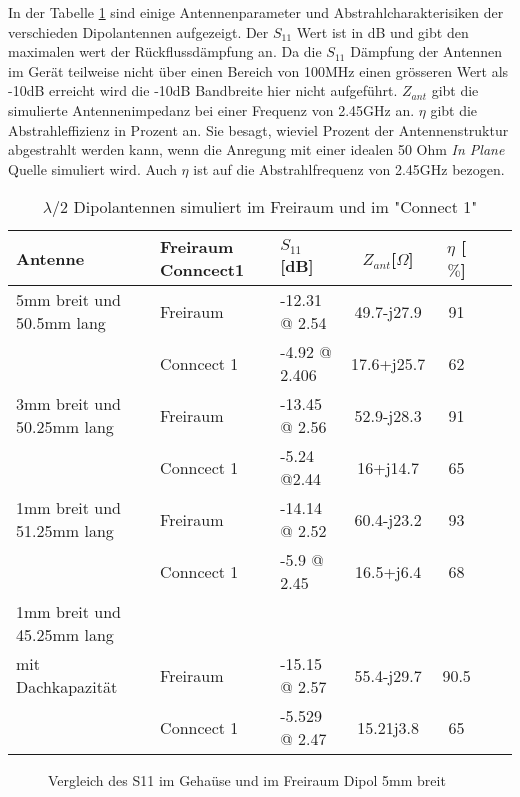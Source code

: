 In der Tabelle \ref{tab:Vergeich_Lambda/2_Freiraum_Geraet} sind einige Antennenparameter und Abstrahlcharakterisiken der verschieden Dipolantennen aufgezeigt. Der $S_{11}$ Wert ist in dB und gibt den maximalen wert der Rückflussdämpfung an. Da die $S_{11}$ Dämpfung der Antennen im Gerät teilweise nicht über einen Bereich von 100MHz einen grösseren Wert als -10dB erreicht wird die -10dB Bandbreite hier nicht aufgeführt.
$Z_{ant}$ gibt die simulierte Antennenimpedanz bei einer Frequenz von 2.45GHz an.
$\eta$ gibt die Abstrahleffizienz in Prozent an. Sie besagt, wieviel Prozent der Antennenstruktur abgestrahlt werden kann, wenn die Anregung mit einer idealen 50 Ohm \textit{In Plane} Quelle simuliert wird. Auch $\eta$ ist auf die Abstrahlfrequenz von 2.45GHz bezogen.

\begin{table}[!ht]
  \centering
  \begin{tabular}{p{4cm} p{2cm} l c c c r} 
  \toprule 
  Antenne                  	& Freiraum Conncect1	 & $S_{11}$[dB]	& $Z_{ant}$[$\Omega$] 	& $\eta$ [$\%$]\\ 
  \midrule
 5mm breit und 50.5mm lang    	& Freiraum			&	-12.31 @ 2.54		&  	49.7-j27.9		&   	91	\\
            					& Conncect 1   			&   -4.92 @ 2.406   		&	17.6+j25.7		& 	62	\\
 3mm breit und 50.25mm lang    & Freiraum			&    -13.45 @ 2.56  		&	52.9-j28.3		&	91	\\
     						& Conncect 1				&  	-5.24 @2.44			&	16+j14.7			&	65	\\
 1mm breit und 51.25mm lang  	& Freiraum			&    -14.14 @ 2.52    	&	60.4-j23.2		&	93	\\
      						& Conncect 1				&  	-5.9 @ 2.45			&	16.5+j6.4		&	68	\\
  1mm breit und 45.25mm lang \\
  mit Dachkapazität  		& Freiraum				&   -15.15 @ 2.57      	&	55.4-j29.7		&	90.5	\\
      						& Conncect 1				&  	-5.529 @ 2.47		&	15.21j3.8		&	65	\\
 \bottomrule
  \end{tabular}
  \caption{$\lambda/2$ Dipolantennen simuliert im Freiraum und im "Connect 1"}
  \label{tab:Vergeich_Lambda/2_Freiraum_Geraet}
\end{table}
\begin{figure}[!ht]
	\centering
	\begingroup
	\endgroup
	\caption{Vergleich des S11 im Gehaüse und im Freiraum Dipol 5mm breit}
	\label{S11_Vergleich_Simulation_5mm}
\end{figure}

